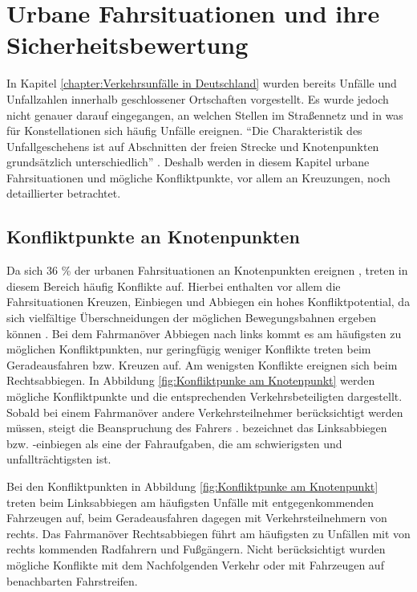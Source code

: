 \section{Urbane Fahrsituationen und ihre Sicherheitsbewertung}\label{section:urbane Fahrsituationen und ihre Sicherheitsbewertung}
In Kapitel \ref{chapter:Verkehrsunfälle in Deutschland} wurden bereits Unfälle und Unfallzahlen innerhalb geschlossener Ortschaften vorgestellt. Es wurde jedoch nicht genauer darauf eingegangen, an welchen Stellen im Straßennetz und in was für Konstellationen sich häufig Unfälle ereignen. \enquote{Die Charakteristik des Unfallgeschehens ist auf Abschnitten der freien Strecke und Knotenpunkten grundsätzlich unterschiedlich} \parencite[S. 83]{Aurich.2015}. Deshalb werden in diesem Kapitel urbane Fahrsituationen und mögliche Konfliktpunkte, vor allem an Kreuzungen, noch detaillierter betrachtet.

\subsection{Konfliktpunkte an Knotenpunkten}\label{subsection:Konfliktpunkte an Knotenpunkten}
Da sich 36 \% der urbanen Fahrsituationen an Knotenpunkten ereignen \parencite[S. 40]{Gerstenberger.17.02.2015}, treten in diesem Bereich häufig Konflikte auf. Hierbei enthalten vor allem die Fahrsituationen Kreuzen, Einbiegen und Abbiegen ein hohes Konfliktpotential, da sich vielfältige Überschneidungen der möglichen Bewegungsbahnen ergeben können \parencite[S. 83]{Reichart.2001}. Bei dem Fahrmanöver Abbiegen nach links kommt es am häufigsten zu möglichen Konfliktpunkten, nur geringfügig weniger Konflikte treten beim Geradeausfahren bzw. Kreuzen auf. Am wenigsten Konflikte ereignen sich beim Rechtsabbiegen. In Abbildung \ref{fig:Konfliktpunke am Knotenpunkt} werden mögliche Konfliktpunkte und die entsprechenden Verkehrsbeteiligten dargestellt. Sobald bei einem Fahrmanöver andere Verkehrsteilnehmer berücksichtigt werden müssen, steigt die Beanspruchung des Fahrers \parencite[S. 9]{Mages.2008}. \Textcite[S. 84]{Reichart.2001} bezeichnet das Linksabbiegen bzw. -einbiegen als eine der Fahraufgaben, die am schwierigsten und unfallträchtigsten ist.

Bei den Konfliktpunkten in Abbildung \ref{fig:Konfliktpunke am Knotenpunkt} treten beim Linksabbiegen am häufigsten Unfälle mit entgegenkommenden Fahrzeugen auf, beim Geradeausfahren dagegen mit Verkehrsteilnehmern von rechts. Das Fahrmanöver Rechtsabbiegen führt am häufigsten zu Unfällen mit von rechts kommenden Radfahrern und Fußgängern. Nicht berücksichtigt wurden mögliche Konflikte mit dem Nachfolgenden Verkehr oder mit Fahrzeugen auf benachbarten Fahrstreifen.

